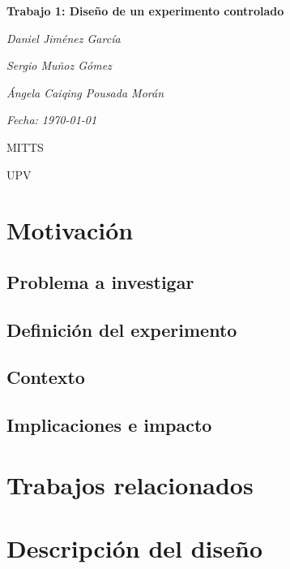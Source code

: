\documentclass[a4paper,12pt]{book}
\begin{document}
\begin{titlepage}
    \centering
    \vspace*{3cm}
    {\Huge\bfseries Trabajo 1: Diseño de un experimento controlado \par}
    \vspace{2cm}
    {\Large\itshape Daniel Jiménez García \par}
    {\Large\itshape Sergio Muñoz Gómez \par}
    {\Large\itshape Ángela Caiqing Pousada Morán \par}
    \vspace{1cm}
    {\Large\itshape Fecha: \today \par}
    \vfill
    {\large MITTS \par}
    {\large UPV \par}
\end{titlepage}





\chapter{Motivación}

\section{Problema a investigar}

\section{Definición del experimento}

\section{Contexto}

\section{Implicaciones e impacto}


\chapter{Trabajos relacionados}

\chapter{Descripción del diseño}
\end{document}
